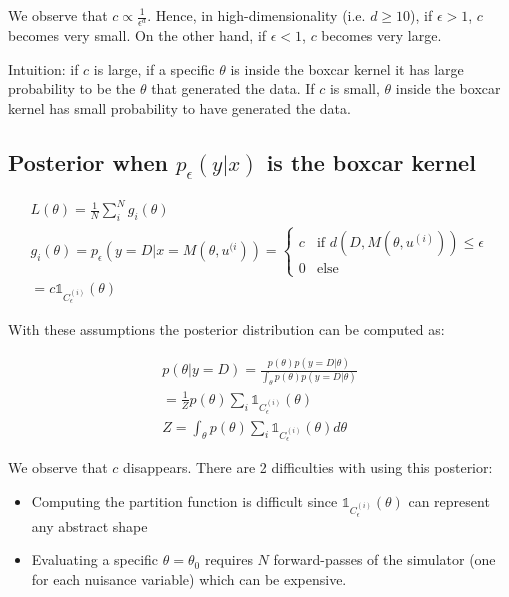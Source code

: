 \documentclass{article}
\begin{document}
 We observe that $c \propto \frac{1}{\epsilon^d}$. Hence, in high-dimensionality (i.e. $d \geq 10$), if $\epsilon > 1$, $c$ becomes very small. On the other hand, if $\epsilon < 1$, $c$ becomes very large.


 Intuition: if $c$ is large, if a specific $\theta$ is inside the boxcar kernel it has large probability to be the $\theta$ that generated the data. If $c$ is small, $\theta$ inside the boxcar kernel has small probability to have generated the data. 

 \subsection*{Posterior when $p_{\epsilon}(y|x)$ is the boxcar kernel}
 
\begin{gather} \label{eq:dual_view_analysis_1}
  L(\theta) = \frac{1}{N} \sum_{i}^N g_i(\theta) \\
  g_i(\theta) = p_\epsilon(y=D|x=M(\theta, u^{(i}))
= \left\{
	\begin{array}{ll}
		c  & \mbox{if } d(D, M(\theta, u^{(i)})) \leq \epsilon \\
		0 & \mbox{else } 
	\end{array}
  \right. \\
  = c\mathbb{1}_{C_\epsilon^{(i)}}(\theta)
\end{gather}

With these assumptions the posterior distribution can be computed as:

\begin{gather} \label{eq:dual_view_analysis_2}
  p(\theta|y=D) = \frac{p(\theta)p(y=D|\theta)}{\int_\theta p(\theta)p(y=D|\theta)} \\
  = \frac{1}{Z}p(\theta) \sum_i \mathbb{1}_{C_\epsilon^{(i)}}(\theta) \\
  Z = \int_\theta p(\theta) \sum_i \mathbb{1}_{C_\epsilon^{(i)}}(\theta) d\theta
\end{gather}

We observe that $c$ disappears. There are 2 difficulties with using this posterior:
\begin{itemize}
\item Computing the partition function is difficult since $\mathbb{1}_{C_\epsilon^{(i)}}(\theta)$ can represent any abstract shape
  \item Evaluating a specific $\theta=\theta_0$ requires $N$ forward-passes of the simulator (one for each nuisance variable) which can be expensive.
  \end{itemize}
\end{document}

